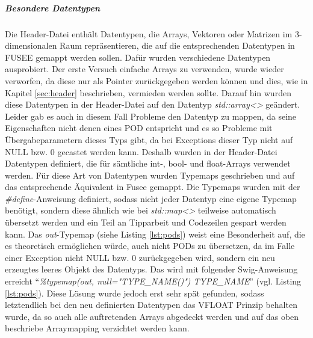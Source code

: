 \begin{code}[caption={inoreregex},label={lst:ignore}, escapechar=|]
\end{code}

\subparagraph{Besondere Datentypen} \label{besonderedatentypen}
Die Header-Datei enthält Datentypen, die Arrays, Vektoren oder Matrizen im 3-dimensionalen Raum repräsentieren, die auf die entsprechenden Datentypen in FUSEE gemappt werden sollen. Dafür wurden verschiedene Datentypen ausprobiert.
Der erste Versuch einfache Arrays zu verwenden, wurde wieder verworfen, da diese nur als Pointer zurückgegeben werden können und dies, wie in Kapitel \ref{sec:header} beschrieben, vermieden werden sollte. Darauf hin wurden diese Datentypen in der Header-Datei auf den Datentyp \emph{std::array<>} geändert. Leider gab es auch in diesem Fall Probleme den Datentyp zu mappen, da seine Eigenschaften nicht denen eines POD entspricht und es so Probleme mit Übergabeparametern dieses Typs gibt, da bei Exceptions dieser Typ nicht auf NULL bzw. 0 gecastet werden kann.
Deshalb wurden in der Header-Datei Datentypen definiert, die für sämtliche int-, bool- und float-Arrays verwendet werden. Für diese Art von Datentypen wurden Typemaps geschrieben und auf das entsprechende Äquivalent in Fusee gemappt. Die Typemaps wurden mit der \emph{\#define}-Anweisung definiert, sodass nicht jeder Datentyp eine eigene Typemap benötigt, sondern diese ähnlich wie bei \emph{std::map<>} teilweise automatisch übersetzt werden und ein Teil an Tipparbeit und Codezeilen gespart werden kann.
Das \emph{out}-Typemap (siehe Listing \ref{lst:pods}) weist eine Besonderheit auf, die es theoretisch ermöglichen würde, auch nicht PODs zu übersetzen, da im Falle einer Exception nicht NULL bzw. 0 zurückgegeben wird, sondern ein neu erzeugtes leeres Objekt des Datentyps. Das wird mit folgender Swig-Anweisung erreicht \enquote{\emph{\%typemap(out, null="TYPE\_NAME()") TYPE\_NAME}} (vgl. Listing \ref{lst:pods}). Diese Lösung wurde jedoch erst sehr spät gefunden, sodass letztendlich bei den neu definierten Datentypen das VFLOAT Prinzip behalten wurde, da so auch alle auftretenden Arrays abgedeckt werden und auf das oben beschriebe Arraymapping verzichtet werden kann. 



